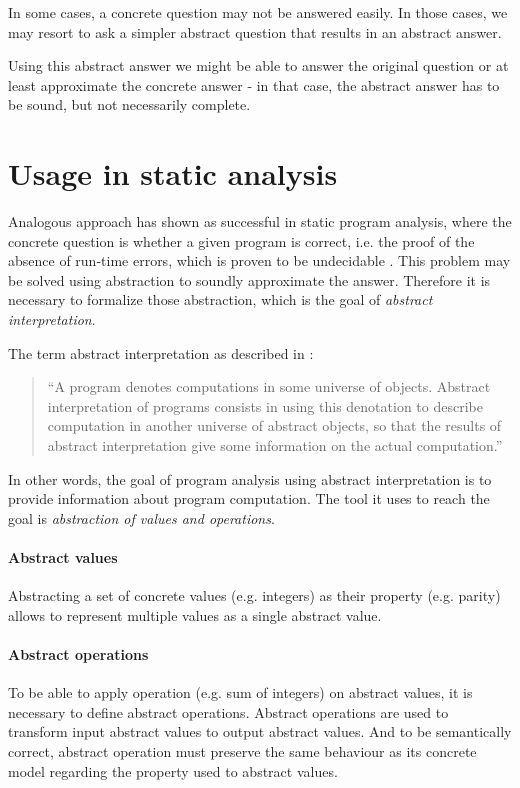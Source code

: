 \documentclass[12pt,oneside]{fithesis2}
\theoremstyle{definition}
\begin{document}
In some cases, a concrete question may not be answered easily. In those cases, we may resort to ask a simpler abstract question that results in an abstract answer.

Using this abstract answer we might be able to answer the original question or at least approximate the concrete answer - in that case, the abstract answer has to be sound, but not necessarily complete. \cite{CousotCousot04-WCC}

\section{Usage in static analysis}

Analogous approach has shown as successful in static program analysis, where the concrete question is whether a given program is correct, i.e. the proof of the absence of run-time errors, which is proven to be undecidable \cite{mine-AIAA10}. This problem may be solved using abstraction to soundly approximate the answer. Therefore it is necessary to formalize those abstraction, which is the goal of \textit{abstract interpretation}.

The term abstract interpretation as described in \cite{CousotCousot77-1}:

\begin{quotation}
``A program denotes computations in some universe of objects. Abstract interpretation of programs consists in using this denotation to describe computation in another universe of abstract objects, so that the results of abstract interpretation give some information on the actual computation.''
\end{quotation}

In other words, the goal of program analysis using abstract interpretation is to provide information about program computation. The tool it uses to reach the goal is \textit{abstraction of values and operations}.

\paragraph{Abstract values}
Abstracting a set of concrete values (e.g. integers) as their property (e.g. parity) allows to represent multiple values as a single abstract value.

\paragraph{Abstract operations}
To be able to apply operation (e.g. sum of integers) on abstract values, it is necessary to define abstract operations. Abstract operations are used to transform input abstract values to output abstract values. And to be semantically correct, abstract operation must preserve the same behaviour as its concrete model regarding the property used to abstract values.
\end{document}
